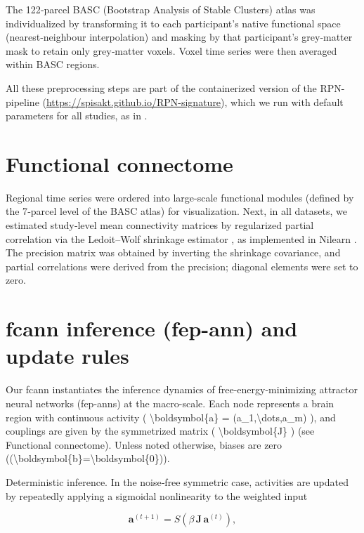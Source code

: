 \documentclass{article}
\begin{document}
The 122‑parcel BASC (Bootstrap Analysis of Stable Clusters) atlas \citep{bellec2010multi} was individualized by transforming it to each participant's native functional space (nearest‑neighbour interpolation) and masking by that participant's grey‑matter mask to retain only grey‑matter voxels. Voxel time series were then averaged within BASC regions.

All these preprocessing steps are part of the containerized version of the RPN-pipeline (\href{https://spisakt.github.io/RPN-signature}{https://spisakt.github.io/RPN-signature}), which we run with default parameters for all studies, as in \cite{Spisak_2020}.

\section{Functional connectome}

Regional time series were ordered into large-scale functional modules (defined by the 7‑parcel level of the BASC atlas) for visualization.
Next, in all datasets, we estimated study‑level mean connectivity matrices by regularized partial correlation via the Ledoit--Wolf shrinkage estimator \citep{Ledoit_2004}, as implemented in Nilearn \citep{abraham2014machine}. The precision matrix was obtained by inverting the shrinkage covariance, and partial correlations were derived from the precision; diagonal elements were set to zero.

\section{\acrshort{fcann} inference (\acrshort{fep-ann}) and update rules}

Our \acrshort{fcann} instantiates the inference dynamics of free-energy-minimizing attractor neural networks (\acrshort{fep-ann}s) at the macro-scale. Each node represents a brain region with continuous activity ( {\textbackslash}boldsymbol\{a\} = (a\_1,{\textbackslash}dots,a\_m) ), and couplings are given by the symmetrized matrix ( {\textbackslash}boldsymbol\{J\} ) (see Functional connectome). Unless noted otherwise, biases are zero (({\textbackslash}boldsymbol\{b\}={\textbackslash}boldsymbol\{0\})).

Deterministic inference. In the noise‑free symmetric case, activities are updated by repeate\acrshort{dl}y applying a sigmoidal nonlinearity to the weighted input

\begin{equation}
\label{fep-deterministic-update}
\boldsymbol{a}^{(t+1)} = S\!\left( \beta\, \boldsymbol{J}\, \boldsymbol{a}^{(t)} \right),
\end{equation}
\end{document}
